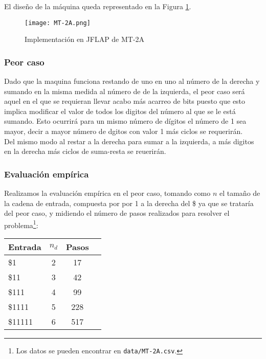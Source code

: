 El diseño de la máquina queda representado en la Figura \ref{fig:MT-2A}.

\begin{figure}[h]
    \centering
    \texttt{[image: MT-2A.png]}
    \caption{Implementación en JFLAP de MT-2A}
    \label{fig:MT-2A}
\end{figure}


\subsubsection*{Peor caso}
Dado que la maquina funciona restando de uno en uno al número de la derecha y sumando en la misma medida al número de de la izquierda, el peor caso será aquel en el que se requieran llevar acabo más acarreo de bits puesto que esto implica modificar el valor de todos los digitos del número al que se le está sumando. Esto ocurrirá para un mismo número de dígitos el número de 1 sea mayor, decir a mayor número de dgitos con valor 1 más ciclos se requerirán.\\
Del mismo modo al restar a la derecha para sumar a la izquierda, a más digitos en la derecha más ciclos de suma-resta se reuerirán.

\subsubsection*{Evaluación empírica}
Realizamos la evaluación empírica en el peor caso, tomando como $n$ el tamaño de la cadena de entrada, compuesta por por 1 a la derecha del \$ ya que se trataría del peor caso, y midiendo el número de pasos realizados para resolver el problema\footnote{Los datos se pueden encontrar en \texttt{data/MT-2A.csv}.}:

\begin{table}[h]
    \centering
    \begin{tabular}{lccc}
        Entrada & $n_d$ & Pasos \\
        \hline
        \$1                     & 2  & 17   \\
        \$11                    & 3  & 42   \\
        \$111                   & 4  & 99  \\
        \$1111                  & 5  & 228  \\
        \$11111                 & 6  & 517  \\
    \end{tabular}
\end{table}


